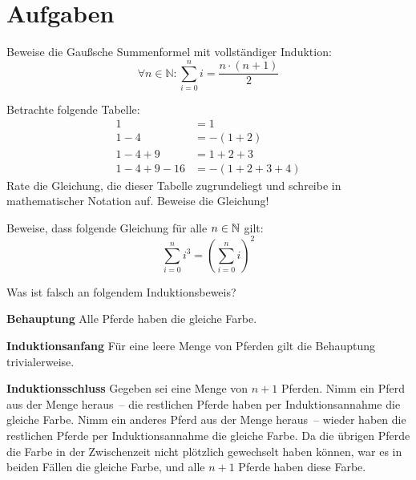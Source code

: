 \section*{Aufgaben}

\begin{aufgabe}
Beweise die Gaußsche
Summenformel mit vollständiger Induktion:
\[\forall n\in\mathbb{N}: \sum_{i=0}^n i =
  \frac{n\cdot(n+1)}{2}\]
\end{aufgabe}

\begin{aufgabe}
  Betrachte folgende Tabelle:
  \begin{displaymath}
    \begin{split}
    1 &= 1\\
    1-4&= -(1+2)\\
    1-4+9&= 1+2+3\\
    1-4+9-16&= -(1+2+3+4)
  \end{split}
\end{displaymath}  %
  Rate die Gleichung, die dieser Tabelle zugrundeliegt und
  schreibe in mathematischer Notation auf.  Beweise die Gleichung!
\end{aufgabe}

\begin{aufgabe}
  Beweise, dass folgende Gleichung für alle $n\in\mathbb{N}$ gilt:
  \begin{displaymath}
    \sum_{i=0}^n i^3 = \left(\sum_{i=0}^n i\right)^2
  \end{displaymath}
\end{aufgabe}

\begin{aufgabe}
  Was ist falsch an folgendem Induktionsbeweis?

  \textbf{Behauptung} Alle Pferde haben die gleiche Farbe.

  \begin{beweis}\par
    \textbf{Induktionsanfang} Für eine leere Menge von Pferden gilt die
    Behauptung trivialerweise.
    
    \textbf{Induktionsschluss} Gegeben sei eine Menge von $n+1$ Pferden.
    Nimm ein Pferd aus der Menge heraus~-- die restlichen Pferde haben per
    Induktionsannahme die gleiche Farbe.  Nimm ein anderes Pferd aus
    der Menge heraus~-- wieder haben die restlichen Pferde per
    Induktionsannahme die gleiche Farbe.  Da die übrigen Pferde die
    Farbe in der Zwischenzeit nicht plötzlich gewechselt haben können, war es in beiden Fällen
    die gleiche Farbe, und alle $n+1$ Pferde haben diese Farbe.
\end{beweis}
\end{aufgabe}


